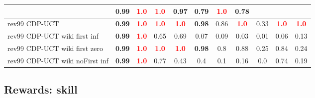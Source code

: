\documentclass{article}
\begin{document}
\begin{tabular}{|l|r@{$\pm$}rr@{$\pm$}rr@{$\pm$}rr@{$\pm$}rr@{$\pm$}rr@{$\pm$}rr@{$\pm$}rr@{$\pm$}rr@{$\pm$}rr@{$\pm$}r|}
& \multicolumn{2}{c}{0.99}
& \multicolumn{2}{c}{\textbf{\textcolor{red}{1.0}}}
& \multicolumn{2}{c}{\textbf{\textcolor{red}{1.0}}}
& \multicolumn{2}{c}{0.97}
& \multicolumn{2}{c}{0.79}
& \multicolumn{2}{c}{\textbf{\textcolor{red}{1.0}}}
& \multicolumn{2}{c|}{0.78}
\\
\hline
rev99 CDP-UCT
& \multicolumn{2}{c}{\textbf{0.99}}
& \multicolumn{2}{c}{\textbf{\textcolor{red}{1.0}}}
& \multicolumn{2}{c}{\textbf{\textcolor{red}{1.0}}}
& \multicolumn{2}{c}{\textbf{\textcolor{red}{1.0}}}
& \multicolumn{2}{c}{\textbf{0.98}}
& \multicolumn{2}{c}{0.86}
& \multicolumn{2}{c}{\textbf{\textcolor{red}{1.0}}}
& \multicolumn{2}{c}{0.33}
& \multicolumn{2}{c}{\textbf{\textcolor{red}{1.0}}}
& \multicolumn{2}{c|}{\textbf{\textcolor{red}{1.0}}}
\\
rev99 CDP-UCT wiki first inf
& \multicolumn{2}{c}{\textbf{0.99}}
& \multicolumn{2}{c}{\textbf{\textcolor{red}{1.0}}}
& \multicolumn{2}{c}{0.65}
& \multicolumn{2}{c}{0.69}
& \multicolumn{2}{c}{0.07}
& \multicolumn{2}{c}{0.09}
& \multicolumn{2}{c}{0.03}
& \multicolumn{2}{c}{0.01}
& \multicolumn{2}{c}{0.06}
& \multicolumn{2}{c|}{0.13}
\\
rev99 CDP-UCT wiki first zero
& \multicolumn{2}{c}{\textbf{0.99}}
& \multicolumn{2}{c}{\textbf{\textcolor{red}{1.0}}}
& \multicolumn{2}{c}{\textbf{\textcolor{red}{1.0}}}
& \multicolumn{2}{c}{\textbf{\textcolor{red}{1.0}}}
& \multicolumn{2}{c}{\textbf{0.98}}
& \multicolumn{2}{c}{0.8}
& \multicolumn{2}{c}{0.88}
& \multicolumn{2}{c}{0.25}
& \multicolumn{2}{c}{0.84}
& \multicolumn{2}{c|}{0.24}
\\
rev99 CDP-UCT wiki noFirst inf
& \multicolumn{2}{c}{\textbf{0.99}}
& \multicolumn{2}{c}{\textbf{\textcolor{red}{1.0}}}
& \multicolumn{2}{c}{0.77}
& \multicolumn{2}{c}{0.43}
& \multicolumn{2}{c}{0.4}
& \multicolumn{2}{c}{0.1}
& \multicolumn{2}{c}{0.16}
& \multicolumn{2}{c}{0.0}
& \multicolumn{2}{c}{0.74}
& \multicolumn{2}{c|}{0.19}
\\
\hline
\end{tabular}%

\bigskip

\subsection*{Rewards: skill}
\end{document}
